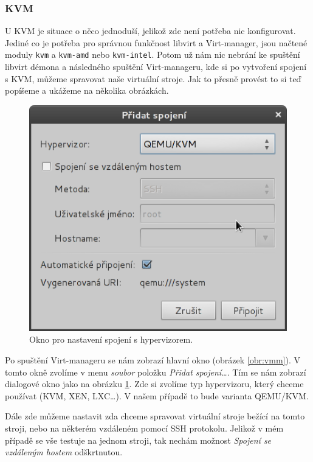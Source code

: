 \subsubsection{KVM}
U KVM je situace o něco jednoduší, jelikož zde není potřeba nic konfigurovat. Jediné co je potřeba pro správnou funkčnost libvirt a Virt-manager, jsou načtené moduly \texttt{kvm} a \texttt{kvm-amd} nebo \texttt{kvm-intel}. Potom už nám nic nebrání ke spuštění libvirt démona a následného spuštění Virt-manageru, kde si po vytvoření spojení s KVM, můžeme spravovat naše virtuální stroje. Jak to přesně provést to si teď popíšeme a ukážeme na několika obrázkách.
\begin{figure}[h!]
  \centering
  \includegraphics[width=12cm]{obr/vmmconnection}
  \caption{Okno pro nastavení spojení s hypervizorem.}
  \label{obr:vmmconnection}
\end{figure}

Po spuštění Virt-manageru se nám zobrazí hlavní okno (obrázek \ref{obr:vmm}). V tomto okně zvolíme v menu \emph{soubor} položku \emph{Přidat spojení\dots}. Tím se nám zobrazí dialogové okno jako na obrázku \ref{obr:vmmconnection}. Zde si zvolíme typ hypervizoru, který chceme používat (KVM, XEN, LXC\dots). V našem případě to bude varianta QEMU/KVM.

Dále zde můžeme nastavit zda chceme spravovat virtuální stroje bežící na tomto stroji, nebo na některém vzdáleném pomocí SSH protokolu. Jelikož v mém případě se vše testuje na jednom stroji, tak nechám možnost \emph{Spojení se vzdáleným hostem} odškrtnutou. 

